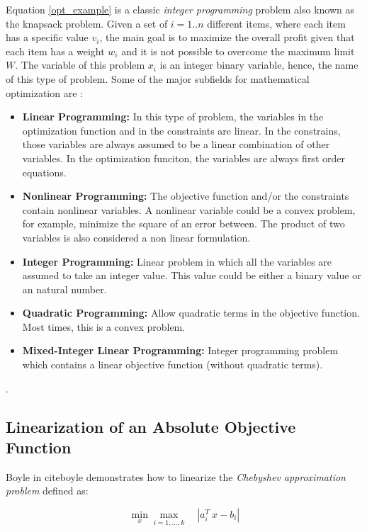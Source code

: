 Equation \eqref{opt_example} is a classic \textit{integer programming} problem also known as the knapsack problem. Given a set of $i = 1..n$ different items, where each item has a specific value $v_i$, the main goal is to maximize the overall profit given that each item has a weight $w_i$ and it is not possible to overcome the maximum limit $W$. The variable of this problem $x_i$ is an integer binary variable, hence, the name of this type of problem. Some of the major subfields for mathematical optimization are \cite{cplex, ampl}:
\begin{itemize}
    \item \textbf{Linear Programming:} In this type of problem, the variables in the optimization function and in the constraints are linear. In the constrains, those variables are always assumed to be a linear combination of other variables. In the optimization funciton, the variables are always first order equations.  
    \item \textbf{Nonlinear Programming:} The objective function and/or the constraints contain nonlinear variables. A nonlinear variable could be a convex problem, for example, minimize the square of an error between. The product of two variables is also considered a non linear formulation. 
    \item \textbf{Integer Programming:} Linear problem in which all the variables are assumed to take an integer value. This value could be either a binary value or an natural number. 
    \item \textbf{Quadratic Programming:} Allow quadratic terms in the objective function. Most times, this is a convex problem.
    \item \textbf{Mixed-Integer Linear Programming:} Integer programming problem which contains a linear objective function (without quadratic terms).
\end{itemize}

\cite{cplex}. 

\subsection{Linearization of an Absolute Objective Function}
Boyle in cite{boyle} demonstrates how to linearize the \textit{Chebyshev approximation problem} defined as:

\begin{equation} \label{chebyshev}
    \min_{x} \max_{i=1,...,k} \quad \left| a_i^T\ x - b_i \right |
\end{equation}

